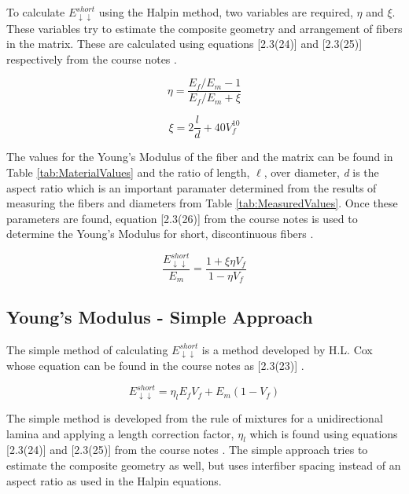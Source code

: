 \documentclass[11pt]{article}
\begin{document}
To calculate \(E_{\downarrow \downarrow}^{short}\) using the Halpin method, two variables are required, \(\eta\) and \(\xi\). These variables try to estimate the composite geometry and arrangement of fibers in the matrix. These are calculated using equations [2.3(24)] and [2.3(25)] respectively from the course notes \cite{course_notes}.

\begin{equation}
\eta = \frac{E_f/E_m-1}{E_f/E_m+\xi}
\end{equation}

\begin{equation}
\xi = 2 \frac{l}{d} +40V^{10}_f
\end{equation}

The values for the Young's Modulus of the fiber and the matrix can be found in Table \ref{tab:MaterialValues} and the ratio of  length, \(\ell\), over diameter, \textit{d} is the aspect ratio which is an important paramater determined from the results of measuring the fibers and diameters from Table \ref{tab:MeasuredValues}. Once these parameters are found, equation [2.3(26)] from the course notes is used to determine the Young's Modulus for short, discontinuous fibers \cite{course_notes}.

\begin{equation} \label{eq:halpin}
\frac{E^{short}_{\downarrow \downarrow}}{E_m} = \frac{1+\xi \eta V_f}{1-\eta V_f}
\end{equation}

\subsection{Young's Modulus - Simple Approach}

The simple method of calculating \(E_{\downarrow \downarrow}^{short}\) is a method developed by H.L. Cox whose equation can be found in the course notes as [2.3(23)] \cite{course_notes}.

\begin{equation} \label{eq:simple}
E^{short}_{\downarrow \downarrow} = \eta_l E_f V_f + E_m(1-V_f)
\end{equation}

The simple method is developed from the rule of mixtures for a unidirectional lamina and applying a length correction factor, \(\eta_l\) which is found using equations [2.3(24)] and [2.3(25)] from the course notes \cite{course_notes}. The simple approach tries to estimate the composite geometry as well, but uses interfiber spacing instead of an aspect ratio as used in the Halpin equations.
\end{document}
